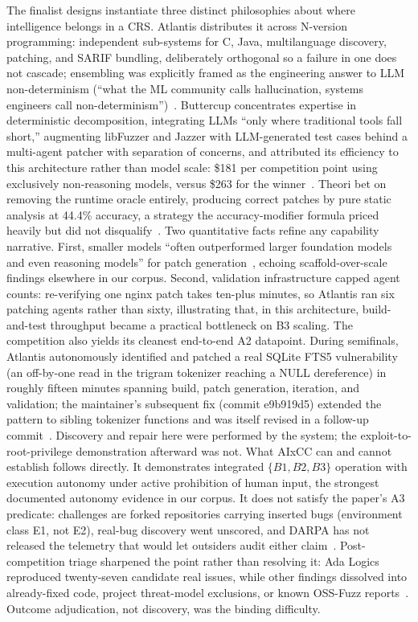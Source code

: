 \documentclass[conference,compsoc]{IEEEtran}
\begin{document}
\label{sec:aixcc-epistemics}
The finalist designs instantiate three distinct philosophies about where intelligence belongs
in a CRS. Atlantis distributes it across N-version programming: independent sub-systems for
C, Java, multilanguage discovery, patching, and SARIF bundling, deliberately orthogonal so a
failure in one does not cascade; ensembling was explicitly framed as the engineering
answer to LLM non-determinism (``what the ML community calls hallucination, systems engineers
call non-determinism'')~\cite{taafc2025}. Buttercup concentrates expertise in deterministic
decomposition, integrating LLMs ``only where traditional tools fall short,'' augmenting
libFuzzer and Jazzer with LLM-generated test cases behind a multi-agent patcher with
separation of concerns, and attributed its efficiency to this architecture rather than model
scale: \$181 per competition point using exclusively non-reasoning models, versus \$263
for the winner~\cite{tobbuttercup2025}. Theori bet on removing the runtime oracle entirely,
producing correct patches by pure static analysis at 44.4\% accuracy, a strategy the
accuracy-modifier formula priced heavily but did not disqualify~\cite{taafc2025}.
Two quantitative facts refine any capability narrative. First, smaller models ``often
outperformed larger foundation models and even reasoning
models'' for patch generation~\cite{taafc2025}, echoing scaffold-over-scale findings elsewhere
in our corpus. Second, validation infrastructure capped agent counts: re-verifying one nginx
patch takes ten-plus minutes, so Atlantis ran six patching agents rather than sixty, 
illustrating that, in this architecture, build-and-test throughput became a practical bottleneck
on B3 scaling.
The competition also yields its cleanest end-to-end A2 datapoint. During semifinals, Atlantis
autonomously identified and patched a real SQLite FTS5 vulnerability (an off-by-one read in
the trigram tokenizer reaching a NULL dereference) in roughly fifteen minutes spanning
build, patch generation, iteration, and validation; the maintainer's subsequent fix
(commit e9b919d5) extended the pattern to sibling tokenizer functions and was itself revised
in a follow-up commit~\cite{taasc2024}. Discovery and repair here were performed by the system;
the exploit-to-root-privilege demonstration afterward was not.
What AIxCC can and cannot establish follows directly. It demonstrates integrated
$\{B1,B2,B3\}$ operation with execution autonomy under active prohibition of human input, 
the strongest documented autonomy evidence in our corpus. It does not satisfy the paper's A3
predicate: challenges
are forked repositories carrying inserted bugs (environment class E1, not E2), real-bug
discovery went unscored, and DARPA has not released the telemetry that would let outsiders
audit either claim~\cite{tobbuttercup2025}. Post-competition triage sharpened the point rather
than resolving it: Ada Logics reproduced twenty-seven candidate real issues, while other
findings dissolved into already-fixed code, project threat-model exclusions, or known
OSS-Fuzz reports~\cite{openssfaixcc2026}. Outcome adjudication, not discovery, was the
binding difficulty.
\end{document}

